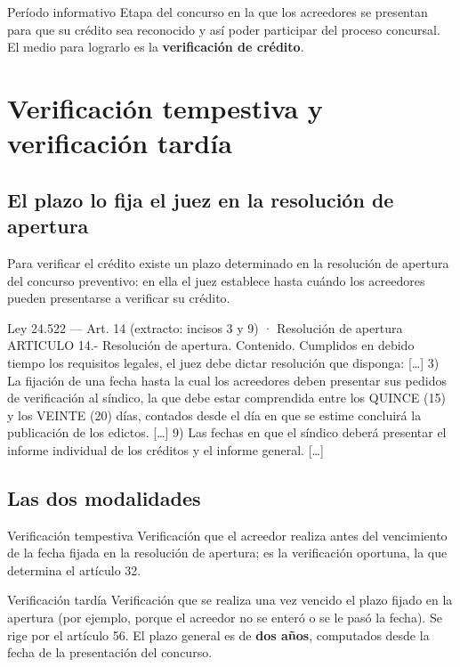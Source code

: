 \documentclass[12pt,oneside]{book}
\begin{document}
\begin{definition}{Período informativo}
Etapa del concurso en la que los acreedores se presentan para que su crédito sea reconocido y así poder participar del proceso concursal. El medio para lograrlo es la \textbf{verificación de crédito}.
\end{definition}

\section{Verificación tempestiva y verificación tardía}

\subsection{El plazo lo fija el juez en la resolución de apertura}

Para verificar el crédito existe un plazo determinado en la resolución de apertura del concurso preventivo: en ella el juez establece hasta cuándo los acreedores pueden presentarse a verificar su crédito.

\begin{legal}{Ley 24.522 — Art. 14 (extracto: incisos 3 y 9) · Resolución de apertura}
ARTICULO 14.- Resolución de apertura. Contenido. Cumplidos en debido tiempo los requisitos legales, el juez debe dictar resolución que disponga: [\dots] 3) La fijación de una fecha hasta la cual los acreedores deben presentar sus pedidos de verificación al síndico, la que debe estar comprendida entre los QUINCE (15) y los VEINTE (20) días, contados desde el día en que se estime concluirá la publicación de los edictos. [\dots] 9) Las fechas en que el síndico deberá presentar el informe individual de los créditos y el informe general. [\dots]
\end{legal}

\subsection{Las dos modalidades}

\begin{definition}{Verificación tempestiva}
Verificación que el acreedor realiza antes del vencimiento de la fecha fijada en la resolución de apertura; es la verificación oportuna, la que determina el artículo 32.
\end{definition}

\begin{definition}{Verificación tardía}
Verificación que se realiza una vez vencido el plazo fijado en la apertura (por ejemplo, porque el acreedor no se enteró o se le pasó la fecha). Se rige por el artículo 56. El plazo general es de \textbf{dos años}, computados desde la fecha de la presentación del concurso.
\end{definition}
\end{document}
